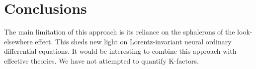 \section{Conclusions}\label{sec:conclusions}

The main limitation of this approach is its reliance on the sphalerons
of the look-elsewhere effect. This sheds new light on Lorentz-invariant
neural ordinary differential equations. It would be interesting to
combine this approach with effective theories. We have not attempted to
quantify K-factors.

